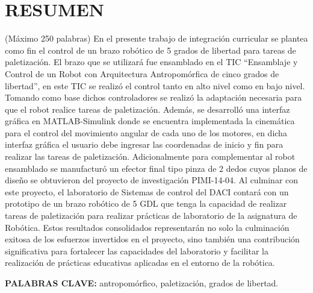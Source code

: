 \chapter*{RESUMEN}
\justifying
(Máximo 250 palabras)
En el presente trabajo de integración curricular se plantea como fin el control de un brazo robótico de 5 grados de libertad para tareas de paletización. El brazo que se utilizará fue ensamblado en el TIC “Ensamblaje y Control de un Robot con Arquitectura Antropomórfica de cinco grados de libertad”, en este TIC se realizó el control tanto en alto nivel como en bajo nivel. Tomando como base dichos controladores se realizó la adaptación necesaria para que el robot realice tareas de paletización. Además, se desarrolló una interfaz gráfica en MATLAB-Simulink donde se encuentra implementada la cinemática para el control del movimiento angular de cada uno de los motores, en dicha interfaz gráfica el usuario debe ingresar las coordenadas de inicio y fin para realizar las tareas de paletización. Adicionalmente para complementar al robot ensamblado se manufacturó un efector final tipo pinza de 2 dedos cuyos planos de diseño se obtuvieron del proyecto de investigación PIMI-14-04. Al culminar con este proyecto, el laboratorio de Sistemas de control del DACI contará con un prototipo de un brazo robótico de 5 GDL que tenga la capacidad de realizar tareas de paletización para realizar prácticas de laboratorio de la asignatura de Robótica. Estos resultados consolidados representarán no solo la culminación exitosa de los esfuerzos invertidos en el proyecto, sino también una contribución significativa para fortalecer las capacidades del laboratorio y facilitar la realización de prácticas educativas aplicadas en el entorno de la robótica.

\vspace{1cm}
\noindent \textbf{PALABRAS CLAVE:} antropomórfico, paletización, grados de libertad.

\newpage
